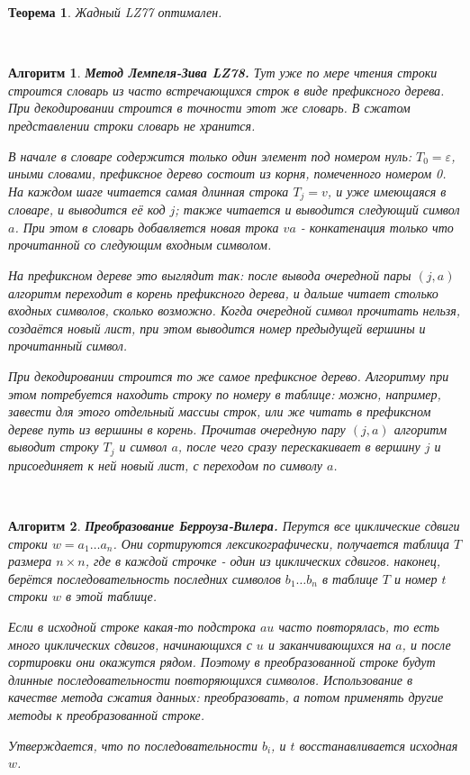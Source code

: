 \documentclass[a4paper]{article}
\theoremstyle{indented}
\newtheorem{theorem}{Теорема}
\newtheorem{alg}{Алгоритм}
\theoremstyle{definition}
\theoremstyle{remark}
\begin{document}
\begin{theorem}
    Жадный LZ77 оптимален.
\end{theorem} \ 

\begin{alg}
    \textbf{Метод Лемпеля-Зива LZ78.} Тут уже по мере чтения строки строится словарь из часто встречающихся строк в виде префиксного дерева. При декодировании строится в точности этот же словарь. В сжатом представлении строки словарь не хранится. \ 

    В начале в словаре содержится только один элемент под номером нуль: $T_0=\varepsilon$, иными словами, префиксное дерево состоит из корня, помеченного номером 0. На каждом шаге читается самая длинная строка $T_j=v$, и уже имеющаяся в словаре, и выводится её код $j$; также читается и выводится следующий символ $a$. При этом в словарь добавляется новая трока $va$ - конкатенация только что прочитанной со следующим входным символом. \ 

    На префиксном дереве это выглядит так: после вывода очередной пары $(j, a)$ алгоритм переходит в корень префиксного дерева, и дальше читает столько входных символов, сколько возможно. Когда очередной символ прочитать нельзя, создаётся новый лист, при этом выводится номер предыдущей вершины и прочитанный символ. \ 

    При декодировании строится то же самое префиксное дерево. Алгоритму при этом потребуется находить строку по номеру в таблице: можно, например, завести для этого отдельный массиы строк, или же читать в префиксном дереве путь из вершины в корень. Прочитав очередную пару $(j, a)$ алгоритм выводит строку $T_j$ и символ $a$, после чего сразу перескакивает в вершину $j$ и присоединяет к ней новый лист, с переходом по символу $a$. 
\end{alg} \ 

\begin{alg}
    \textbf{Преобразование Берроуза-Вилера.} Перутся все циклические сдвиги строки $w=a_1\ldots a_n$. Они сортируются лексикографически, получается таблица $T$ размера $n\times n$, где в каждой строчке - один из циклических сдвигов. наконец, берётся последовательность последних символов $b_1\ldots b_n$ в таблице $T$ и номер $t$ строки $w$ в этой таблице. \ 

    Если в исходной строке какая-то подстрока $au$ часто повторялась, то есть много циклических сдвигов, начинающихся с $u$ и заканчивающихся на $a$, и после сортировки они окажутся рядом. Поэтому в преобразованной строке будут длинные последовательности повторяющихся символов. Использование в качестве метода сжатия данных: преобразовать, а потом применять другие методы к преобразованной строке. \ 

    Утверждается, что по последовательности $b_i$, и $t$ восстанавливается исходная $w$. 
\end{alg}
\end{document}
